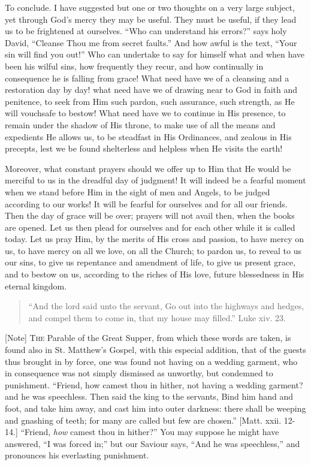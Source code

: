 To conclude. I have suggested but one or two thoughts on a very
large subject, yet through God's mercy they may be useful. They must
be useful, if they lead us to be frightened at ourselves. ``Who
can understand his errors?'' says holy David, ``Cleanse Thou
me from secret faults.'' And how awful is the text, ``Your sin
will find you out!'' Who can undertake to say for himself what and
when have been his wilful sins, how frequently they recur, and how
continually in consequence he is falling from grace! What need have we
of a cleansing and a restoration day by day! what need have we of
drawing near to God in faith and penitence, to seek from Him such
pardon, such assurance, such strength, as He will vouchsafe to bestow!
What need have we to continue in His presence, to remain under the
shadow of His throne, to make use of all the means and expedients He
allows us, to be steadfast in His Ordinances, and zealous in His
precepts, lest we be found shelterless and helpless when He visits the
earth!

Moreover, what constant prayers should we offer up to Him that He
would be merciful to us in the dreadful day of judgment! It will
indeed be a fearful moment when we stand before Him in the sight of
men and Angels, to be judged according to our works! It will be
fearful for ourselves and for all our friends. Then the day of grace
will be over; prayers will not avail then, when the books are opened.
Let us then plead for ourselves and for each other while it is called
today. Let us pray Him, by the merits of His cross and passion, to
have mercy on us, to have mercy on all we love, on all the Church; to
pardon us, to reveal to us our sins, to give us repentance and
amendment of life, to give us present grace, and to bestow on us,
according to the riches of His love, future blessedness in His eternal
kingdom.


\begin{quote}

``And the lord said unto the servant, Go out into the
highways and hedges, and compel them to come in, that my house may
filled.'' Luke xiv. 23.

\end{quote}

[Note] T\textsc{he} Parable of the Great
Supper, from which these words are taken, is found also in St.
Matthew's Gospel, with this especial addition, that of the guests thus
brought in by force, one was found not having on a wedding garment,
who in consequence was not simply dismissed as unworthy, but condemned
to punishment. ``Friend, how camest thou in hither, not having a
wedding garment? and he was speechless. Then said the king to the
servants, Bind him hand and foot, and take him away, and cast him into
outer darkness: there shall be weeping and gnashing of teeth; for many
are called but few are chosen.'' [Matt. xxii. 12-14.]
``Friend, \emph{how} camest thou in hither?'' You may suppose
he might have answered, ``I was forced in;'' but our Saviour
says, ``And he was speechless,'' and pronounces his
everlasting punishment.

